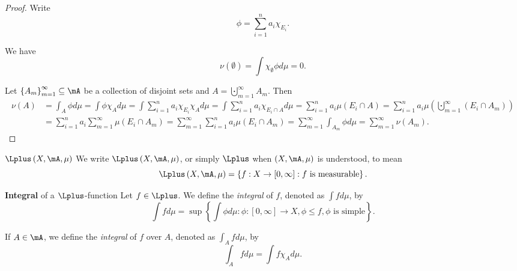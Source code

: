 \documentclass[pmath451]{subfiles}
\begin{document}
    \begin{proof}
        Write
        \begin{equation*}
            \phi = \sum^{n}_{i=1}a_i\chi_{E_i}.
        \end{equation*}

        We have
        \begin{equation*}
            \nu\left( \emptyset \right) = \int\chi_{\emptyset}\phi d\mu = 0.
        \end{equation*}

        Let $\left\lbrace A_m \right\rbrace^{\infty}_{m=1}\subseteq\mA$ be a collection of disjoint sets and $A=\bigcupdot^{\infty}_{m=1}A_m$. Then
        \begin{equation*}
            \begin{aligned}
                \nu\left( A \right) & = \int_A\phi d\mu = \int\phi\chi_Ad\mu = \int\sum^{n}_{i=1}a_i\chi_{E_i}\chi_Ad\mu = \int\sum^{n}_{i=1}a_i\chi_{E_i\cap A}d\mu = \sum^{n}_{i=1}a_i\mu\left( E_i\cap A \right) = \sum^{n}_{i=1}a_i\mu\left( \bigcupdot^{\infty}_{m=1}\left( E_i\cap A_m \right) \right) \\
                                    & = \sum^{n}_{i=1}a_i \sum^{\infty}_{m=1}\mu\left( E_i\cap A_m \right) = \sum^{\infty}_{m=1} \sum^{n}_{i=1}a_i\mu\left( E_i\cap A_m \right) = \sum^{\infty}_{m=1} \int_{A_m}\phi d\mu = \sum^{\infty}_{m=1} \nu\left( A_m \right).
            \end{aligned} 
        \end{equation*}
    \end{proof}

    \begin{notation}{$\Lplus\left( X,\mA,\mu \right)$}
        We write $\Lplus\left( X,\mA,\mu \right)$, or simply $\Lplus$ when $\left( X,\mA,\mu \right)$ is understood, to mean
        \begin{equation*}
            \Lplus\left( X,\mA,\mu \right) = \left\lbrace f:X\to\left[ 0,\infty \right] : f\text{ is measurable} \right\rbrace.
        \end{equation*}
    \end{notation}
    
    \begin{definition}{\textbf{Integral} of a $\Lplus$-function}
        Let $f\in\Lplus$. We define the \emph{integral} of $f$, denoted as $\int f d\mu$, by
        \begin{equation*}
            \int fd\mu = \sup\left\lbrace \int\phi d\mu : \phi:\left[ 0,\infty \right]\to X, \phi\leq f, \phi\text{ is simple} \right\rbrace.
        \end{equation*}

        If $A\in\mA$, we define the \emph{integral} of $f$ over $A$, denoted as $\int_Afd\mu$, by
        \begin{equation*}
            \int_Afd\mu = \int f\chi_Ad\mu.
        \end{equation*}
    \end{definition}
    
\end{document}
